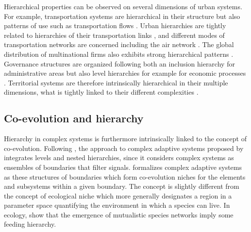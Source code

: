 \documentclass[english,fleqn,allpages]{ISTE_science}[2018/07/30]
\begin{document}
Hierarchical properties can be observed on several dimensions of urban systems. For example, transportation systems are hierarchical in their structure \citep{yerra2005emergence} but also patterns of use such as transportation flows \citep{jiang2009street}. Urban hierarchies are tightly related to hierarchies of their transportation links \citep{bigotte2010integrated}, and different modes of transportation networks are concerned including the air network \citep{dang2012hierarchy}. The global distribution of multinational firms also exhibits strong hierarchical patterns \citep{godfrey1999ranking}. Governance structures are organized following both an inclusion hierarchy for administrative areas \citep{li2015administrative} but also level hierarchies for example for economic processes \citep{liao2017opening}. Territorial systems are therefore intrinsically hierarchical in their multiple dimensions, what is tightly linked to their different complexities \citep{2019arXiv190109869R}. 




\subsection{Co-evolution and hierarchy}



Hierarchy in complex systems is furthermore intrinsically linked to the concept of co-evolution. Following \cite{lane2006hierarchy}, the approach to complex adaptive systems proposed by \cite{holland2012signals} integrates levels and nested hierarchies, since it considers complex systems as ensembles of boundaries that filter signals. \cite{holland2012signals} formalizes complex adaptive systems as these structures of boundaries which form co-evolution niches for the elements and subsystems within a given boundary. The concept is slightly different from the concept of ecological niche which more generally designates a region in a parameter space quantifying the environment in which a species can live. In ecology, \cite{pires2011food} show that the emergence of mutualistic species networks imply some feeding hierarchy.
\end{document}
